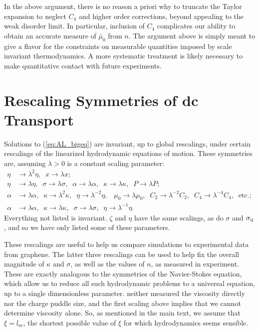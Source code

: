 In the above argument, there is no reason a priori why to truncate the Taylor expansion to neglect $C_4$ and higher order corrections, beyond appealing to the weak disorder limit.   In particular, inclusion of $C_4$ complicates our ability to obtain an accurate measure of $\bar\mu_0$ from $n$.    The argument above is simply meant to give a flavor for the constraints on measurable quantities imposed by scale invariant thermodynamics.   A more systematic treatment is likely necessary to make quantitative contact with future experiments.

\section{Rescaling Symmetries of dc Transport}\label{apprescale}
Solutions to (\ref{eq:AL_bigeq}) are invariant, up to global rescalings, under certain rescalings of the linearized hydrodynamic equations of motion.   These symmetries are, assuming $\lambda>0$ is a constant scaling parameter:  
\begin{subequations}\begin{align}
\eta &\rightarrow \lambda^2 \eta, \;\; x \rightarrow \lambda x; \\
\eta &\rightarrow \lambda \eta, \;\; \sigma \rightarrow \lambda \sigma, \;\; \alpha \rightarrow \lambda\alpha, \;\; \kappa \rightarrow \lambda\kappa, \;\; P \rightarrow \lambda P; \\
\alpha &\rightarrow \lambda \alpha, \;\; \kappa \rightarrow \lambda^{2}\kappa, \;\; \eta \rightarrow \lambda^{-2} \eta, \;\;\; \mu_0 \rightarrow \lambda \mu_0, \;\; C_2 \rightarrow \lambda^{-2}C_2,\;\; C_4 \rightarrow \lambda^{-4}C_4,\;\; \mathrm{etc.}; \\
\alpha &\rightarrow \lambda \alpha, \;\; \kappa \rightarrow \lambda\kappa, \;\; \sigma \rightarrow \lambda\sigma, \;\; \eta \rightarrow \lambda^{-1} \eta.
\end{align}\end{subequations}
Everything not listed is invariant.  $\zeta$ and $\eta$ have the same scalings, as do $\sigma$ and $\sigma_{\textsc{q}}$, and so we have only listed some of these parameters.     

These rescalings are useful to help us compare simulations to experimental data from graphene.  The latter three rescalings can be used to help fix the overall magnitude of $\kappa$ and $\sigma$, as well as the values of $n$, as measured in experiment.    These are exactly analogous to the symmetries of the Navier-Stokes equation, which allow us to reduce all such hydrodynamic problems to a universal equation, up to a single dimensionless parameter.   \cite{crossno_observation_2016} neither measured the viscosity directly nor the charge puddle size, and the first scaling above implies that we cannot determine viscosity alone.  So, as mentioned in the main text, we assume that $\xi = l_{\mathrm{ee}}$,  the shortest possible value of $\xi$ for which hydrodynamics seems sensible.   

